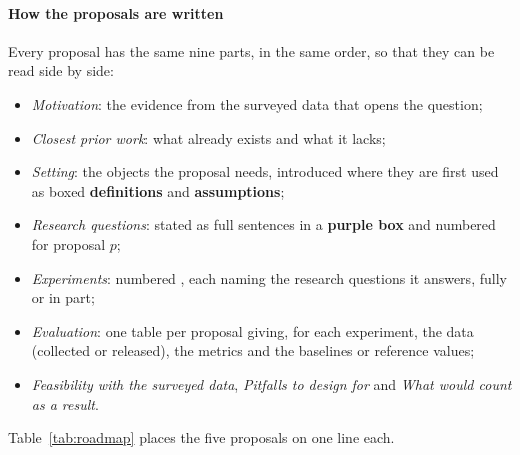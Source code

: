 \documentclass[10pt,a4paper]{article}
\begin{document}
\paragraph{How the proposals are written} Every proposal has the same nine parts, in the same order, so that they can be read side by side:
\begin{itemize}[leftmargin=1.1em]
\item \emph{Motivation}: the evidence from the surveyed data that opens the question;
\item \emph{Closest prior work}: what already exists and what it lacks;
\item \emph{Setting}: the objects the proposal needs, introduced where they are first used as boxed \textcolor{s1!65!black}{\textbf{definitions}} and \textcolor{warning!60!black}{\textbf{assumptions}};
\item \emph{Research questions}: stated as full sentences in a \textcolor{s7!65!black}{\textbf{purple box}} and numbered  for proposal $p$;
\item \emph{Experiments}: numbered , each naming the research questions it answers, fully or in part;
\item \emph{Evaluation}: one table per proposal giving, for each experiment, the data (collected or released), the metrics and the baselines or reference values;
\item \emph{Feasibility with the surveyed data}, \emph{Pitfalls to design for} and \emph{What would count as a result}.
\end{itemize}
Table~\ref{tab:roadmap} places the five proposals on one line each.
\end{document}
